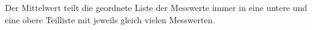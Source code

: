 
Der Mittelwert teilt die geordnete Liste der Messwerte immer in eine untere und eine obere Teilliste mit jeweils gleich vielen Messwerten.
